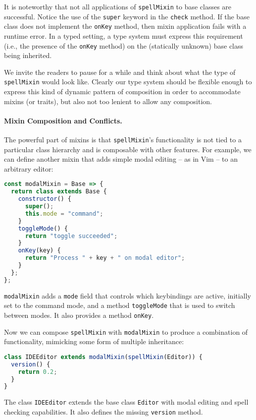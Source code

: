 It is noteworthy that not all applications of \lstinline{spellMixin} to base
classes are successful. Notice the use of the \lstinline{super} keyword in the
\lstinline{check} method. If the base class does not implement the
\lstinline{onKey} method, then mixin application fails with a runtime error. In
a typed setting, a type system must express this requirement (i.e., the presence of
the \lstinline{onKey} method) on the (statically unknown) base class being inherited.




We invite the readers to pause for a while and think about what the type of
\lstinline{spellMixin} would look like. Clearly our type system should be
flexible enough to express this kind of dynamic pattern of composition in order
to accommodate mixins (or traits), but also not too lenient to allow any
composition.


\paragraph{Mixin Composition and Conflicts.}
The powerful part of mixins is that \lstinline{spellMixin}'s functionality is not
tied to a particular class hierarchy and is composable with other features. For
example, we can define another mixin that adds simple modal editing -- as in Vim
-- to an arbitrary editor:
\begin{lstlisting}[language=JavaScript]
const modalMixin = Base => {
  return class extends Base {
    constructor() {
      super();
      this.mode = "command";
    }
    toggleMode() {
      return "toggle succeeded";
    }
    onKey(key) {
      return "Process " + key + " on modal editor";
    }
  };
};
\end{lstlisting}
\lstinline{modalMixin} adds a \lstinline{mode} field that controls which
keybindings are active, initially set to the command mode, and a method
\lstinline{toggleMode} that is used to switch between modes. It also provides a method \lstinline{onKey}.

Now we can compose \lstinline{spellMixin} with \lstinline{modalMixin} to produce
a combination of functionality, mimicking some form of multiple inheritance:
\begin{lstlisting}[language=JavaScript]
class IDEEditor extends modalMixin(spellMixin(Editor)) {
  version() {
    return 0.2;
  }
}
\end{lstlisting}
The class \lstinline{IDEEditor} extends the base class \lstinline{Editor} with
modal editing and spell checking capabilities. It also defines the missing
\lstinline{version} method.

